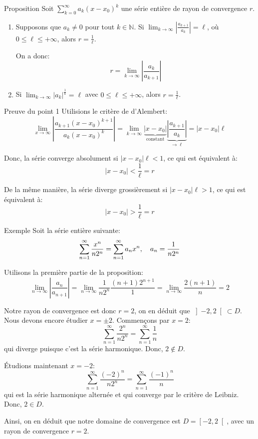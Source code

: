 \documentclass[a4paper]{article}
\begin{document}
\begin{parag}{Proposition}
    Soit $\sum_{k=0}^{\infty} a_k\left(x - x_0\right)^k$ une série entière de rayon de convergence $r$.
    \begin{enumerate}
        \item Supposons que $a_k \neq 0$ pour tout $k \in \mathbb{N}$. Si $\lim_{k \to \infty} \left|\frac{a_{k+1}}{a_k}\right| = \ell$, où $0 \leq \ell \leq +\infty$, alors $r = \frac{1}{\ell}$.

        On a donc:
        \[r = \lim_{k \to \infty} \left|\frac{a_k}{a_{k+1}}\right|\]

        \item Si $\lim_{k \to \infty} \left|a_k\right|^{\frac{1}{k}} = \ell$ avec $0 \leq \ell \leq +\infty$, alors $r = \frac{1}{\ell}$.
    \end{enumerate}

    \begin{subparag}{Preuve du point 1}
        Utilisions le critère de d'Alembert:
        \[\lim_{x \to \infty} \left|\frac{a_{k+1} \left(x - x_0\right)^{k+1}}{a_k \left(x - x_0\right)^k}\right| = \lim_{k \to \infty} \underbrace{\left|x - x_0\right|}_{\text{constant}} \underbrace{\left|\frac{a_{k+1}}{a_k}\right|}_{\to \ell} = \left|x - x_0\right| \ell\]

        Donc, la série converge absolument si $\left|x - x_0\right|\ell < 1$, ce qui est équivalent à:
        \[\left|x - x_0\right| < \frac{1}{\ell} = r\]

        De la même manière, la série diverge grossièrement si $\left|x - x_0\right| \ell > 1$, ce qui est équivalent à:
        \[\left|x - x_0\right| > \frac{1}{\ell} = r\]
    \end{subparag}
\end{parag}

\begin{parag}{Exemple}
    Soit la série entière suivante:
    \[\sum_{n=1}^{\infty} \frac{x^n}{n2^n} = \sum_{n=1}^{\infty} a_n x^n, \quad a_n = \frac{1}{n 2^n}\]

    Utilisons la première partie de la proposition:
    \[\lim_{n \to \infty} \left|\frac{a_n}{a_{n+1}}\right| = \lim_{n \to \infty} \frac{1}{n 2^n} \frac{\left(n + 1\right)2^{n+1}}{1} = \lim_{n \to \infty} \frac{2\left(n+1\right)}{n} = 2\]

    Notre rayon de convergence est donc $r = 2$, on en déduit que $\left]-2, 2\right[ \subset D$. Nous devons encore étudier $x = \pm 2$. Commençons par $x = 2$:
    \[\sum_{n=1}^{\infty} \frac{2^n}{n 2^n} = \sum_{n=1}^{\infty} \frac{1}{n}\]
    qui diverge puisque c'est la série harmonique. Donc, $2 \not \in D$.

    Étudions maintenant $x = -2$:
    \[\sum_{n=1}^{\infty} \frac{\left(-2\right)^n}{n2^n} = \sum_{n=1}^{\infty} \frac{\left(-1\right)^n}{n}\]
    qui est la série harmonique alternée et qui converge par le critère de Leibniz. Donc, $2 \in D$.

    Ainsi, on en déduit que notre domaine de convergence est $D = \left[-2, 2\right[ $, avec un rayon de convergence $r = 2$.
\end{parag}
\end{document}
